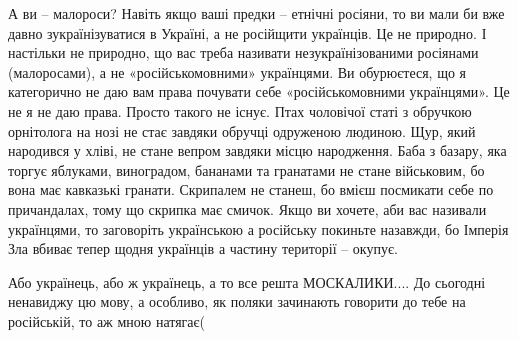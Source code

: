 А ви – малороси? Навіть якщо ваші предки – етнічні росіяни, то ви мали би вже
давно зукраїнізуватися в Україні, а не російщити українців. Це не природно. І
настільки не природно, що вас треба називати незукраїнізованими росіянами
(малоросами), а не «російськомовними» українцями. Ви обурюєтеся, що я
категорично не даю вам права почувати себе «російськомовними українцями». Це не
я не даю права. Просто такого не існує. Птах чоловічої статі з обручкою
орнітолога на нозі не стає завдяки обручці одруженою людиною. Щур, який
народився у хліві, не стане вепром завдяки місцю народження. Баба з базару, яка
торгує яблуками, виноградом, бананами та гранатами не стане військовим, бо вона
має кавказькі гранати. Скрипалем не станеш, бо вмієш посмикати себе по
причандалах, тому що скрипка має смичок. Якщо ви хочете, аби вас називали
українцями, то заговоріть українською а російську покиньте назавжди, бо Імперія
Зла вбиває тепер щодня українців а частину території – окупує.

\begin{cmtfront}

Або українець, або ж українець, а то все решта МОСКАЛИКИ.... До сьогодні
ненавиджу цю мову, а особливо, як поляки зачинають говорити до тебе на
російській, то аж мною натягає(
	
\end{cmtfront}

